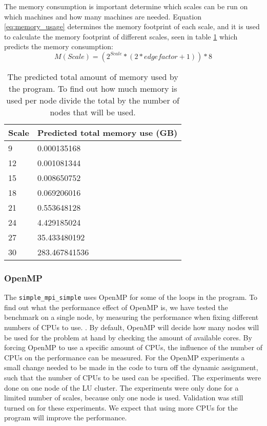 The memory consumption is important determine which scales can be run on which machines and how many machines are needed. Equation \ref{eq:memory_usage} determines the memory footprint of each scale, and it is used to calculate the memory footprint of different scales, seen in table \ref{tab:calculation memory consumption} which predicts the memory consumption:
\begin{equation}
\label{eq:memory_usage}
M(Scale) = (2^{Scale} *(2*edgefactor + 1)) * 8
\end{equation}
\begin{table} [!h]
	\begin{center}
		\begin{tabular}{|l|l|}
			\hline
			Scale & Predicted total memory use (GB) \\ \hline
			9 &  0.000135168 \\ \hline
			12 & 0.001081344 \\ \hline
			15 & 0.008650752 \\ \hline
			18 & 0.069206016 \\ \hline
			21 & 0.553648128 \\ \hline
			24 & 4.429185024 \\ \hline
			27 & 35.433480192 \\ \hline
			30 & 283.467841536 \\ \hline
		\end{tabular}
	\end{center}
	
	\caption{The predicted total amount of memory used by the program. To find out how much memory is used per node divide the total by the number of nodes that will be used.}
	\label{tab:calculation memory consumption}
\end{table}


\subsubsection{OpenMP}
The \texttt{simple\_mpi\_simple} uses OpenMP for some of the loops in the program. To find out what the performance effect of OpenMP is, we have tested the benchmark on a single node, by measuring the performance when fixing different numbers of CPUs to use. . By default, OpenMP will decide how many nodes will be used for the problem at hand by checking the amount of available cores. By forcing OpenMP to use a specific amount of CPUs, the influence of the number of CPUs on the performance can be measured. For the OpenMP experiments a small change needed to be made in the code to turn off the dynamic assignment, such that the number of CPUs to be used can be specified. The experiments were done on one node of the LU cluster. The experiments were only done for a limited number of scales, because only one node is used. Validation was still turned on for these experiments. We expect that using more CPUs for the program will improve the performance.

